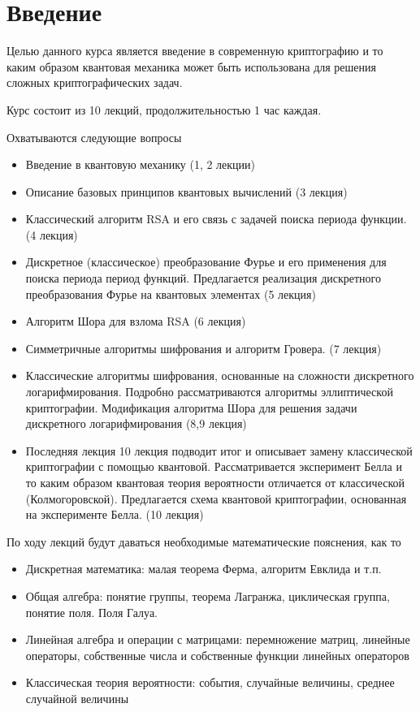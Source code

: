 \chapter*{Введение}
Целью данного курса является введение в современную криптографию и то
каким образом квантовая механика может быть использована для решения
сложных криптографических задач.

Курс состоит из 10 лекций, продолжительностью 1 час каждая.

Охватываются следующие вопросы
\begin{itemize}
\item Введение в квантовую механику (1, 2 лекции)
\item Описание базовых принципов квантовых вычислений (3 лекция)
\item Классический алгоритм RSA и его связь с задачей поиска периода
  функции. (4 лекция) 
\item Дискретное (классическое) преобразование Фурье и
его применения для поиска периода период функций. Предлагается
реализация дискретного преобразования Фурье на квантовых элементах 
(5 лекция)
\item Алгоритм Шора для взлома RSA (6 лекция)
\item Симметричные алгоритмы шифрования и алгоритм
Гровера. (7 лекция)
\item Классические алгоритмы шифрования, основанные на
сложности дискретного логарифмирования. Подробно рассматриваются
алгоритмы эллиптической криптографии. Модификация алгоритма Шора для
решения задачи дискретного логарифмирования (8,9 лекция)
\item Последняя лекция 10 лекция подводит итог и описывает замену
  классической криптографии с  помощью квантовой. Рассматривается
  эксперимент Белла и то каким образом квантовая теория вероятности
  отличается от классической (Колмогоровской). Предлагается схема
  квантовой криптографии, основанная на эксперименте Белла. 
  (10 лекция)
\end{itemize}

По ходу лекций будут даваться необходимые математические пояснения, как
то
\begin{itemize}
\item Дискретная математика: малая теорема Ферма, алгоритм
  Евклида и т.п.
\item Общая алгебра: понятие группы, теорема Лагранжа, циклическая
  группа, понятие поля. Поля Галуа.
\item Линейная алгебра и операции с матрицами: перемножение матриц,
  линейные операторы, собственные числа и собственные функции линейных
  операторов
\item Классическая теория вероятности: события, случайные величины,
среднее случайной величины
\end{itemize}


